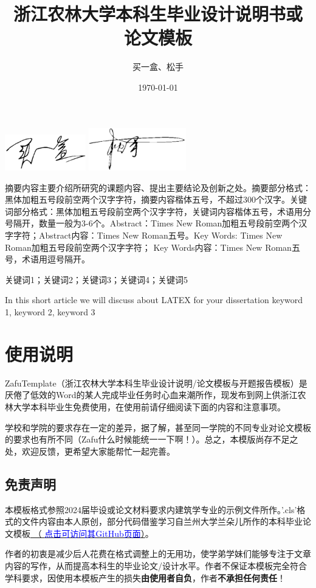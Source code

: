 \documentclass[AutoFakeBold]{ZafuThesis}
\author{买一盒、松手}%
\date{\today}%
\title{{浙江农林大学本科生}{毕业设计说明书或论文模板}}%
\begin{document}
\customCover

\setsignature
  {
  \includegraphics[width=100pt]{figures/MaiYihe}
  \includegraphics[width=120pt]{figures/SongShou}
  }
\makestatement


\customContent

\frontmatter
\ZhAbstract
{
  摘要内容主要介绍所研究的课题内容、提出主要结论及创新之处。摘要部分格式：黑体加粗五号段前空两个汉字字符，摘要内容楷体五号，不超过300个汉字。关键词部分格式：黑体加粗五号段前空两个汉字字符，关键词内容楷体五号，术语用分号隔开，数量一般为3-6个。Abstract：Times New Roman加粗五号段前空两个汉字字符；Abstract内容：Times New Roman五号。Key Words: Times New Roman加粗五号段前空两个汉字字符； Key Words内容：Times New Roman五号，术语用逗号隔开。
  
}
{关键词1；关键词2；关键词3；关键词4；关键词5}


\EnAbstract
{In this short article we will discuss about LATEX for your dissertation}
{keyword 1, keyword 2, keyword 3}


\mainmatter
\section{使用说明}
ZafuTemplate（浙江农林大学本科生毕业设计说明/论文模板与开题报告模板）是厌倦了低效的Word的某人完成毕业任务时心血来潮所作，现发布到网上供浙江农林大学本科毕业生免费使用，在使用前请仔细阅读下面的内容和注意事项。\par
学校和学院的要求存在一定的差异，据了解，甚至同一学院的不同专业对论文模板的要求也有所不同（Zafu什么时候能统一一下啊！）。总之，本模版尚存不足之处，欢迎反馈，更希望大家能帮忙一起完善。
\subsection{免责声明}
本模板格式参照2024届毕设或论文材料要求内建筑学专业的示例文件所作。'.cls'格式的文件内容由本人原创，部分代码借鉴学习自兰州大学兰朵儿所作的本科毕业论文模板\href{https://github.com/yuhldr/LZUThesis2020}{
  （ \textcolor{blue}{点击可访问其GitHub页面}）}。\par
作者的初衷是减少后人花费在格式调整上的无用功，使学弟学妹们能够专注于文章内容的写作，从而提高本科生的毕业论文/设计水平。作者不保证本模板完全符合学科要求，因使用本模板产生的损失{\bfseries 由使用者自负}，作者{\bfseries 不承担任何责任}！
\end{document}
